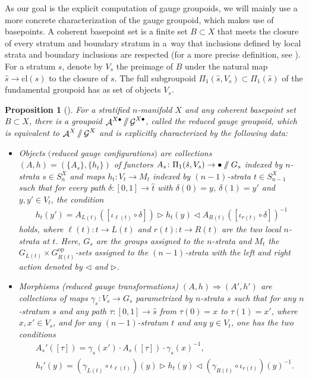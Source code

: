 \documentclass[10pt,a4paper]{amsart}
\DeclareMathOperator{\cala}{\mathcal{A}}
\DeclareMathOperator{\calg}{\mathcal{G}}
\newcommand{\sslash}{\mathbin{/\mkern-6mu/}}
\numberwithin{equation}{section}
\newtheorem{Proposition}[Proposition]{Proposition}
\theoremstyle{definition}
\begin{document}
As our goal is the explicit computation of gauge groupoids, we will mainly use a more concrete characterization of the gauge groupoid, which makes use of basepoints. A coherent basepoint set is a finite set $B \subset X$ that meets the closure of every stratum and boundary stratum in a~way that inclusions defined by local strata and boundary inclusions are respected (for a more precise definition, see \cite[Definition~5.14]{FMM}). For a stratum $s$, denote by $V_s$ the preimage of $B$ under the natural map $\hat{s} \rightarrow \mathrm{cl}(s)$ to the closure of $s$. The full subgroupoid $\Pi_1(\hat{s}, V_s) \subset \Pi_1(\hat{s})$ of the fundamental groupoid has as set of objects $V_s$.

\begin{Proposition}[{\cite[Corollary 5.18 and Proposition 5.19]{FMM}}]
 \label{propGG}
 For a stratified $n$-manifold $X$ and any coherent basepoint set $B \subset X$, there is a groupoid $\cala^{X \bullet} \sslash \calg^{X \bullet}$, called the \textit{reduced gauge groupoid}, which is equivalent to $\cala^X \sslash \calg^X$ and is explicitly characterized by the following data:
 \begin{itemize}\itemsep=0pt
 \item Objects $($\textnormal{reduced gauge configurations}$)$ are collections $(A, h) = (\{A_s\}, \{h_t\})$ of functors $A_s\colon \Pi_1(\hat{s}, V_s) \rightarrow \bullet \sslash G_s$ indexed by $n$-strata $s \in S_n^X$ and maps $h_t\colon V_t \rightarrow M_t$ indexed by $(n-1)$-strata $t \in S_{n-1}^X$ such that for every path $\delta\colon [0,1] \rightarrow \hat{t}$ with $\delta(0) = y$, $\delta(1) = y'$ and $y, y' \in V_t$, the condition
 \begin{align*}
 h_t(y') = A_{L(t)} ([ \iota_{\ell(t)} \circ \delta] ) \triangleright h_t(y) \triangleleft A_{R(t)} ([\iota_{r(t)} \circ \delta] )^{-1}
 \end{align*}
 holds, where $\ell(t)\colon t \rightarrow L(t)$ and $r(t)\colon t \rightarrow R(t)$ are the two local $n$-strata at $t$. Here, $G_s$ are the groups assigned to the $n$-strata and $M_t$ the $G_{L(t)} \times G_{R(t)}^{\mathrm{op}}$-sets assigned to the $(n-1)$-strata with the left and right action denoted by $\triangleleft$ and $\triangleright$.
 \item Morphisms (\textnormal{reduced gauge transformations}) $(A, h) \Rightarrow (A', h')$ are collections of maps $\gamma_s\colon V_s \rightarrow G_s$ parametrized by $n$-strata $s$ such that for any $n$-stratum $s$ and any path $\tau\colon [0,1] \rightarrow \hat{s}$ from $\tau(0) = x$ to $\tau(1) = x'$, where $x, x' \in V_s$, and for any $(n-1)$-stratum $t$ and any $y \in V_t$, one has the two conditions
 \begin{align*}
& A_s'([\tau])= \gamma_s(x') \cdot A_s([\tau]) \cdot \gamma_s(x)^{-1}, \\
&h_t'(y)= (\gamma_{L(t)} \circ \iota_{\ell(t)})(y) \triangleright h_t(y) \triangleleft (\gamma_{R(t)} \circ \iota_{r(t)})(y)^{-1}.
 \end{align*}
 \end{itemize}
\end{Proposition}
\end{document}
